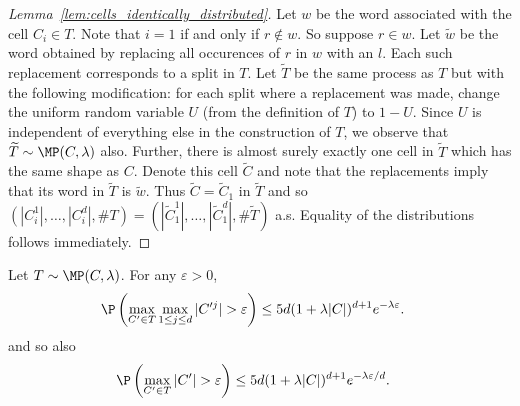 \documentclass{article}
\begin{document}
\begin{proof}[Lemma~\ref{lem:cells_identically_distributed}]

  Let $w$ be the word associated with the cell $C_i \in T$.
  Note that $i=1$ if and only if $r \notin w$.
  So suppose $r \in w$.
  Let $\widetilde w$ be the word obtained by replacing all occurences
  of $r$ in $w$ with an $l$.
  Each such replacement corresponds to a split in $T$.
  Let $\widetilde T$ be the same process as $T$ but with the following modification:
  for each split where a replacement was made,
  change the uniform random variable $U$
  (from the definition of $T$) to $1-U$.
  Since $U$ is independent of everything else in the construction of $T$,
  we observe that $\widetilde T \sim \MP(C, \lambda)$ also.
  Further, there is almost surely exactly one cell in $\widetilde T$
  which has the same shape as $C$.
  Denote this cell $\widetilde C$ and note that
  the replacements imply that its word in $\widetilde T$
  is $\widetilde w$.
  Thus $\widetilde C = \widetilde C_1$ in $\widetilde T$ and so
  $(|C_i^1|, \ldots, |C_i^d|, \# T)
  = (|\widetilde C_1^1|, \ldots, |\widetilde C_1^d|, \# \widetilde T)$
  a.s.
  Equality of the distributions follows immediately.
\end{proof}




\begin{lemma}
  \label{lem:largest_cell_tail}

  Let $T \sim \MP(C, \lambda)$.
  For any $\varepsilon > 0$,
  \begin{align*}
    \P\left(
    \max_{C' \in T}
    \max_{1 \leq j \leq d}
    |C'^j| > \varepsilon
    \right)
    &\leq
      5d (1 + \lambda |C|)^{d+1}
      e^{-\lambda \varepsilon}.
  \end{align*}
  and so also
  \begin{align*}
    \P\left(
    \max_{C' \in T}
    |C'| > \varepsilon
    \right)
    &\leq
      5 d (1 + \lambda |C|)^{d+1}
      e^{-\lambda \varepsilon / d}.
  \end{align*}
\end{lemma}
\end{document}
